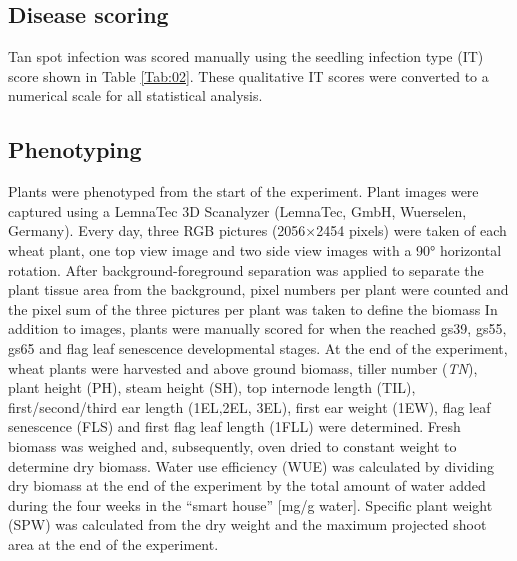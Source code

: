\documentclass{frontiersSCNS} %
\begin{document}
\subsection{Disease scoring}
Tan spot infection was scored manually using the seedling infection type (IT) score shown in Table \ref{Tab:02}. These qualitative IT scores were converted to a numerical scale for all statistical analysis.

\subsection{Phenotyping}
Plants were phenotyped from the start of the experiment. Plant images were captured using a LemnaTec 3D Scanalyzer (LemnaTec, GmbH, Wuerselen, Germany). Every day, three RGB pictures (2056×2454 pixels) were taken of each wheat plant, one top view image and two side view images with a 90° horizontal rotation. After background-foreground separation was applied to separate the plant tissue area from the background, pixel numbers per plant were counted and the pixel sum of the three pictures per plant was taken to define the biomass %
In addition to images, plants were manually scored for when the reached gs39, gs55, gs65 and flag leaf senescence developmental stages. At the end of the experiment, wheat plants were harvested and above ground biomass, tiller number (\textit{TN}), plant height (PH), steam height (SH), top internode length (TIL), first/second/third ear length (1EL,2EL, 3EL), first ear weight (1EW), flag leaf senescence (FLS) and first flag leaf length (1FLL) were determined. Fresh biomass was weighed and, subsequently, oven dried to constant weight to determine dry biomass. Water use efficiency (WUE) was calculated by dividing dry biomass at the end of the experiment by the total amount of water added during the four weeks in the “smart house” [mg/g water]. Specific plant weight (SPW) was calculated from the dry weight and the maximum projected shoot area at the end of the experiment. 
\end{document}
